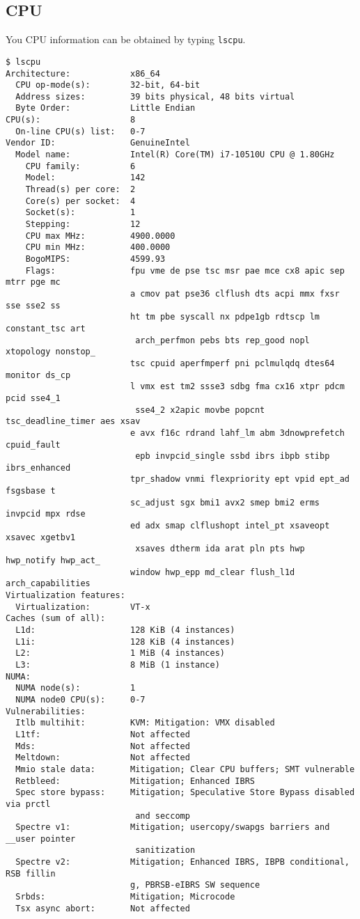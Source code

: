\documentclass[superscriptaddress]{revtex4-2}
\begin{document}
\subsection{CPU}
You CPU information can be obtained by typing \texttt{lscpu}.
\begin{lstlisting}
$ lscpu
Architecture:            x86_64
  CPU op-mode(s):        32-bit, 64-bit
  Address sizes:         39 bits physical, 48 bits virtual
  Byte Order:            Little Endian
CPU(s):                  8
  On-line CPU(s) list:   0-7
Vendor ID:               GenuineIntel
  Model name:            Intel(R) Core(TM) i7-10510U CPU @ 1.80GHz
    CPU family:          6
    Model:               142
    Thread(s) per core:  2
    Core(s) per socket:  4
    Socket(s):           1
    Stepping:            12
    CPU max MHz:         4900.0000
    CPU min MHz:         400.0000
    BogoMIPS:            4599.93
    Flags:               fpu vme de pse tsc msr pae mce cx8 apic sep mtrr pge mc
                         a cmov pat pse36 clflush dts acpi mmx fxsr sse sse2 ss 
                         ht tm pbe syscall nx pdpe1gb rdtscp lm constant_tsc art
                          arch_perfmon pebs bts rep_good nopl xtopology nonstop_
                         tsc cpuid aperfmperf pni pclmulqdq dtes64 monitor ds_cp
                         l vmx est tm2 ssse3 sdbg fma cx16 xtpr pdcm pcid sse4_1
                          sse4_2 x2apic movbe popcnt tsc_deadline_timer aes xsav
                         e avx f16c rdrand lahf_lm abm 3dnowprefetch cpuid_fault
                          epb invpcid_single ssbd ibrs ibpb stibp ibrs_enhanced 
                         tpr_shadow vnmi flexpriority ept vpid ept_ad fsgsbase t
                         sc_adjust sgx bmi1 avx2 smep bmi2 erms invpcid mpx rdse
                         ed adx smap clflushopt intel_pt xsaveopt xsavec xgetbv1
                          xsaves dtherm ida arat pln pts hwp hwp_notify hwp_act_
                         window hwp_epp md_clear flush_l1d arch_capabilities
Virtualization features: 
  Virtualization:        VT-x
Caches (sum of all):     
  L1d:                   128 KiB (4 instances)
  L1i:                   128 KiB (4 instances)
  L2:                    1 MiB (4 instances)
  L3:                    8 MiB (1 instance)
NUMA:                    
  NUMA node(s):          1
  NUMA node0 CPU(s):     0-7
Vulnerabilities:         
  Itlb multihit:         KVM: Mitigation: VMX disabled
  L1tf:                  Not affected
  Mds:                   Not affected
  Meltdown:              Not affected
  Mmio stale data:       Mitigation; Clear CPU buffers; SMT vulnerable
  Retbleed:              Mitigation; Enhanced IBRS
  Spec store bypass:     Mitigation; Speculative Store Bypass disabled via prctl
                          and seccomp
  Spectre v1:            Mitigation; usercopy/swapgs barriers and __user pointer
                          sanitization
  Spectre v2:            Mitigation; Enhanced IBRS, IBPB conditional, RSB fillin
                         g, PBRSB-eIBRS SW sequence
  Srbds:                 Mitigation; Microcode
  Tsx async abort:       Not affected
\end{lstlisting}
\end{document}
